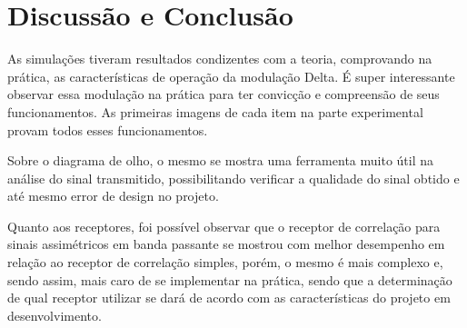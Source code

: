 \newpage
\section{Discussão e Conclusão}
As simulações tiveram resultados condizentes com a teoria, comprovando na prática, as características de operação da modulação Delta. É super interessante observar essa modulação na prática para ter convicção e compreensão de seus funcionamentos. As primeiras imagens de cada item na parte experimental provam todos esses funcionamentos.

Sobre o diagrama de olho, o mesmo se mostra uma ferramenta muito útil na análise do sinal transmitido, possibilitando verificar a qualidade do sinal obtido e até mesmo error de design no projeto.

Quanto aos receptores, foi possível observar que o receptor de correlação para sinais assimétricos em banda passante se mostrou com melhor desempenho em relação ao receptor de correlação simples, porém, o mesmo é mais complexo e, sendo assim, mais caro de se implementar na prática, sendo que a determinação de qual receptor utilizar se dará de acordo com as características do projeto em desenvolvimento.